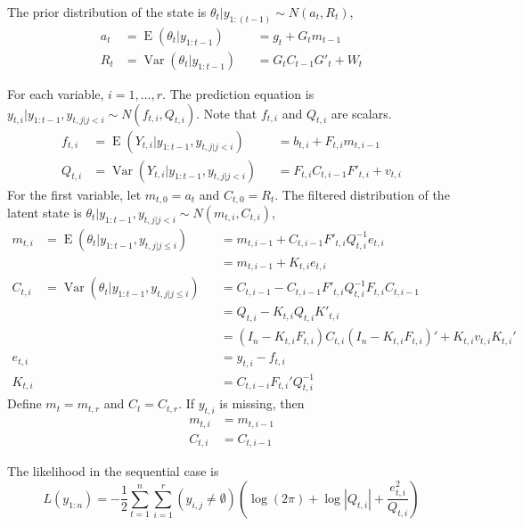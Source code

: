 \documentclass{article}\usepackage[]{graphicx}\usepackage[]{color}
\DeclareMathOperator{\E}{E}
\DeclareMathOperator{\Var}{Var}
\begin{document}
The prior distribution of the state is $\theta_{t} | y_{1:(t-1)} \sim N(a_{t}, R_{t})$,
\begin{align}
  a_{t} &= \E(\theta_{t} | y_{1:t-1}) &&= g_{t} + G_{t} m_{t-1} \\
  R_{t} &= \Var(\theta_{t} | y_{1:t-1}) &&= G_{t} C_{t-1} G'_{t} + W_{t}
\end{align}

For each variable, $i = 1, \dots, r$.
The prediction equation is $y_{t,i} | y_{1:t-1}, y_{t,j|j < i} \sim N(f_{t,i}, Q_{t,i})$.
Note that $f_{t,i}$ and $Q_{t,i}$ are scalars.
\begin{align}
  f_{t,i} &= \E(Y_{t,i} | y_{1:t-1}, y_{t,j | j < i}) &&= b_{t,i} + F_{t,i} m_{t,i-1} \\
  Q_{t,i} &= \Var(Y_{t,i} | y_{1:t-1}, y_{t, j | j < i}) &&= F_{t,i} C_{t,i-1} F'_{t,i} + v_{t,i}
\end{align}
For the first variable, let $m_{t,0} = a_{t}$ and $C_{t,0} = R_{t}$.
The filtered distribution of the latent state is $\theta_{t} | y_{1:t-1}, y_{t,j|j < i} \sim N(m_{t,i}, C_{t,i})$,
\begin{align}
  m_{t,i} &= \E(\theta_{t} | y_{1:t-1}, y_{t, j | j \leq i}) &&= m_{t,i-1} + C_{t,i-1} F'_{t,i} Q_{t,i}^{-1} e_{t,i} \\
  &&& = m_{t,i-1} + K_{t,i} e_{t,i} \\
  C_{t,i} &= \Var(\theta_{t} | y_{1:t-1}, y_{t, j|j \leq i}) &&= C_{t,i-1} - C_{t,i-1} F'_{t,i} Q_{t,i}^{-1} F_{t,i} C_{t,i-1} \\
  &&& = Q_{t,i} - K_{t,i} Q_{t,i} K'_{t,i} \\  
  &&& = (I_{n} - K_{t,i} F_{t,i}) C_{t,i} (I_{n} - K_{t,i} F_{t,i})' + K_{t,i} v_{t,i} K_{t,i}' \\
  e_{t,i} &&&= y_{t,i} - f_{t,i} \\
  K_{t,i} &&&= C_{t,i-i} F_{t,i}' Q_{t,i}^{-1}
\end{align}
Define $m_{t} = m_{t,r}$ and $C_{t} = C_{t,r}$.
If $y_{t,i}$ is missing, then 
\begin{align}
  m_{t,i} &= m_{t,i-1} \\
  C_{t,i} &= C_{t,i-1}
\end{align}

The likelihood in the sequential case is
\begin{equation}
  L(y_{1:n}) = -\frac{1}{2} \sum_{t=1}^{n} \sum_{i=1}^{r} (y_{i,j} \neq \emptyset)
  \left( 
    \log (2 \pi) + \log |Q_{t,i}| + \frac{e_{t,i}^{2}}{Q_{t,i}} 
  \right)
\end{equation}
\end{document}
